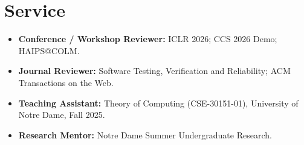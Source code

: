 \documentclass[10pt,letterpaper]{article}
\newenvironment{sectionbody}{\begin{list}{}{\setlength{\leftmargin}{12pt}\setlength{\rightmargin}{0pt}\setlength{\topsep}{0pt}\setlength{\partopsep}{0pt}\setlength{\parsep}{0pt}\setlength{\itemsep}{0pt}}\item[]}{\end{list}}
\begin{document}
\section{Service}
\begin{sectionbody}
\begin{itemize}
\item \textbf{Conference / Workshop Reviewer:} ICLR 2026; CCS 2026 Demo; HAIPS@COLM.
\item \textbf{Journal Reviewer:} Software Testing, Verification and Reliability; ACM Transactions on the Web.
\item \textbf{Teaching Assistant:} Theory of Computing (CSE-30151-01), University of Notre Dame, Fall 2025.
\item \textbf{Research Mentor:} Notre Dame Summer Undergraduate Research.
\end{itemize}
\end{sectionbody}
\end{document}
